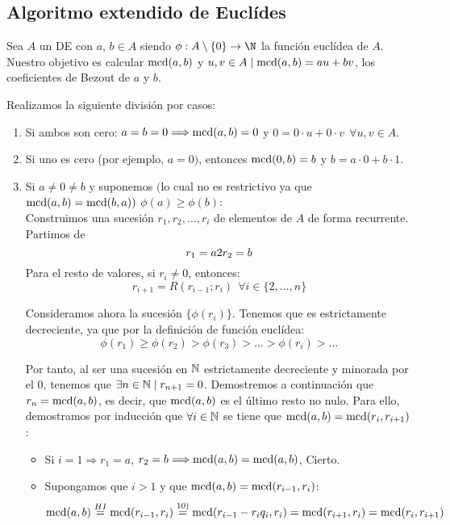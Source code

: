 \subsection{Algoritmo extendido de Euclídes}

Sea $A$ un DE con $a$, $b \in A$ siendo $\phi:A\setminus\{0\}\rightarrow\N$ la función euclídea de $A$. Nuestro objetivo es calcular $\operatorname{mcd}(a,b)$ y $u,v \in A \mid \operatorname{mcd}(a,b) = au+bv$, los coeficientes de Bezout de $a$ y $b$.

Realizamos la siguiente división por casos:
\begin{enumerate}
    \item Si ambos son cero: $a=b=0 \Longrightarrow \operatorname{mcd}(a,b)= 0 $ y $0 = 0\cdot u + 0 \cdot v~~\forall u,v \in A$.
    \item Si uno es cero (por ejemplo, $a=0)$, entonces $\operatorname{mcd}(0,b) = b$ y $b=a\cdot 0 + b \cdot 1$.

    \item Si $a \neq 0 \neq b$ y suponemos $($lo cual no es restrictivo ya que $\operatorname{mcd}(a,b)=\operatorname{mcd}(b,a))$ $\phi(a) \geq \phi(b)$:\\


    Construimos una sucesión $r_1, r_2, \ldots, r_i$ de elementos de $A$ de forma recurrente. Partimos de 
    $$r_1 = a 2 r_2 = b$$
    Para el resto de valores, si $r_i \neq 0$, entonces:
    $$r_{i+1}= R(r_{i-1};r_i)~~\forall i \in \{2, \ldots, n\}$$

    Consideramos ahora la sucesión $\{\phi(r_i)\}$. Tenemos que es estrictamente decreciente, ya que por la definición de función euclídea:    
    $$\phi(r_1) \geq \phi(r_2) > \phi(r_3) > \ldots > \phi(r_i) > \ldots$$

    Por tanto, al ser una sucesión en $\mathbb{N}$ estrictamente decreciente y minorada por el $0$, tenemos que $\exists n\in \mathbb{N}\mid r_{n+1}=0$. Demostremos a continuación que $r_n = \operatorname{mcd}(a,b)$, es decir, que $\operatorname{mcd}(a,b)$ es el último resto no nulo. Para ello, demostramos por inducción que $\forall i \in \mathbb{N}$ se tiene que $\operatorname{mcd}(a,b) = \operatorname{mcd}(r_i, r_{i+1})$:
    \begin{itemize}
        \item Si $i=1 \Longrightarrow r_1 = a$, $r_2 = b \Longrightarrow \operatorname{mcd}(a,b) = \operatorname{mcd}(a,b)$, Cierto.
        \item Supongamos que $i>1$ y que $\operatorname{mcd}(a,b) = \operatorname{mcd}(r_{i-1}, r_i)$:
        $$\operatorname{mcd}(a,b) \stackrel{HI}{=} \operatorname{mcd}(r_{i-1}, r_i) \stackrel{10)}{=} \operatorname{mcd}(r_{i-1}-r_iq_i, r_i) = \operatorname{mcd}(r_{i+1}, r_i) = \operatorname{mcd}(r_i, r_{i+1})$$
    \end{itemize}


\end{enumerate}
